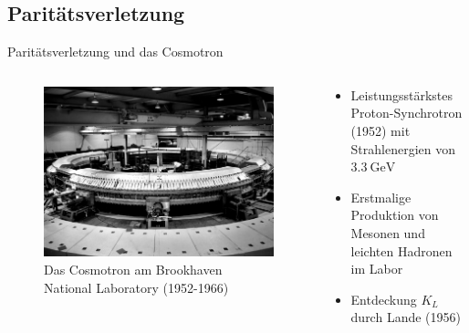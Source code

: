 \documentclass[aspectratio=1610, professionalfonts, 9pt, t]{beamer}
\begin{document}
\subsection{Paritätsverletzung}

  \begin{frame}{Paritätsverletzung und das Cosmotron}
    \begin{columns}[onlytextwidth]
      \begin{column}{0.4\textwidth}
        \begin{figure}[ht]
          \begin{center}
            \includegraphics[height=0.6\textheight]{Images/cosmotron.jpg} %
            \caption{Das Cosmotron am Brookhaven National Laboratory (1952-1966)}
          \end{center}
        \end{figure}
      \end{column}
      \begin{column}{0.5\textwidth}
        \begin{itemize}
          \item Leistungsstärkstes Proton-Synchrotron (1952) mit Strahlenergien von $\SI{3.3}{\giga\electronvolt}$
          \item Erstmalige Produktion von Mesonen und leichten Hadronen im Labor
          \item Entdeckung $K_{L}$ durch Lande (1956) %

\end{itemize}
\end{column}
\end{columns}
\end{frame}
\end{document}
